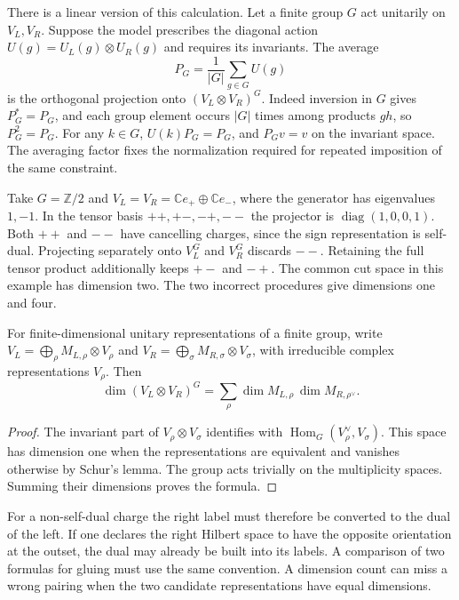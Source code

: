 \documentclass[11pt,letterpaper]{article}
\newcommand{\CC}{\mathbb C}
\begin{document}
There is a linear version of this calculation. Let a finite group \(G\)
act unitarily on \(V_L,V_R\). Suppose the model prescribes the diagonal
action \(U(g)=U_L(g)\otimes U_R(g)\) and requires its invariants. The average
\begin{equation}
 P_G=\frac1{|G|}\sum_{g\in G}U(g)
 \label{eq:reynolds}
\end{equation}
is the orthogonal projection onto \((V_L\otimes V_R)^G\).
Indeed inversion in \(G\) gives \(P_G^*=P_G\), and each group element occurs
\(|G|\) times among products \(g h\), so \(P_G^2=P_G\). For any \(k\in G\),
\(U(k)P_G=P_G\), and \(P_Gv=v\) on the invariant space. The averaging factor
fixes the normalization required for repeated imposition of the same constraint.

Take \(G=\mathbb Z/2\) and
\(V_L=V_R=\CC e_+\oplus\CC e_-\), where the generator has eigenvalues
\(1,-1\). In the tensor basis \(++,+-,-+,--\) the projector is
\(\operatorname{diag}(1,0,0,1)\). Both \(++\) and \(--\) have cancelling
charges, since the sign representation is self-dual. Projecting separately
onto \(V_L^G\) and \(V_R^G\) discards \(--\). Retaining the full tensor
product additionally keeps \(+-\) and \(-+\). The common cut space in this
example has dimension two. The two incorrect procedures give dimensions
one and four.

\begin{proposition}
For finite-dimensional unitary representations of a finite group, write
\(V_L=\bigoplus_\rho M_{L,\rho}\otimes V_\rho\) and
\(V_R=\bigoplus_\sigma M_{R,\sigma}\otimes V_\sigma\), with irreducible
complex representations \(V_\rho\). Then
\[
 \dim (V_L\otimes V_R)^G
   = \sum_\rho \dim M_{L,\rho}\,\dim M_{R,\rho^\vee}.
\]
\end{proposition}
\begin{proof}
The invariant part of \(V_\rho\otimes V_\sigma\) identifies with
\(\operatorname{Hom}_G(V_\rho^\vee,V_\sigma)\). This space has dimension
one when the representations are equivalent and vanishes otherwise by
Schur's lemma. The group acts trivially on the multiplicity spaces.
Summing their dimensions proves the formula.
\end{proof}

For a non-self-dual charge the right label must therefore be converted to
the dual of the left. If one declares the right Hilbert space to have the
opposite orientation at the outset, the dual may already be built into its
labels. A comparison of two formulas for gluing must use the same convention.
A dimension count can miss a wrong pairing when the two candidate
representations have equal dimensions.
\end{document}
